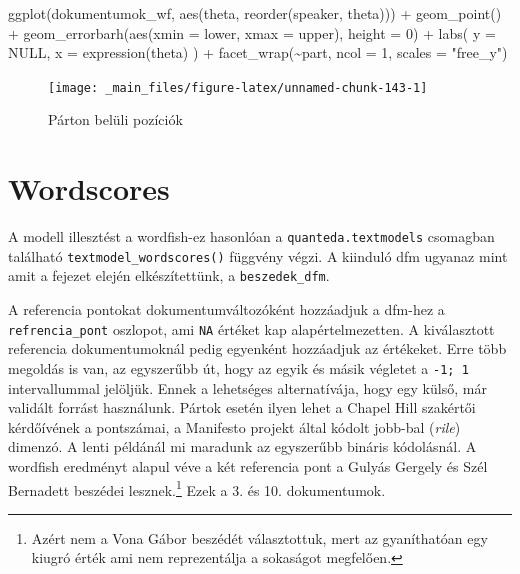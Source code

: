 \documentclass[
]{book}
\newenvironment{Shaded}{\begin{snugshade}}{\end{snugshade}}
\newcommand{\AttributeTok}[1]{\textcolor[rgb]{0.77,0.63,0.00}{#1}}
\newcommand{\ConstantTok}[1]{\textcolor[rgb]{0.00,0.00,0.00}{#1}}
\newcommand{\DecValTok}[1]{\textcolor[rgb]{0.00,0.00,0.81}{#1}}
\newcommand{\FunctionTok}[1]{\textcolor[rgb]{0.00,0.00,0.00}{#1}}
\newcommand{\NormalTok}[1]{#1}
\newcommand{\SpecialCharTok}[1]{\textcolor[rgb]{0.00,0.00,0.00}{#1}}
\newcommand{\StringTok}[1]{\textcolor[rgb]{0.31,0.60,0.02}{#1}}
\begin{document}
\begin{Shaded}
\begin{Highlighting}[]
\FunctionTok{ggplot}\NormalTok{(dokumentumok\_wf, }\FunctionTok{aes}\NormalTok{(theta, }\FunctionTok{reorder}\NormalTok{(speaker, theta))) }\SpecialCharTok{+}
  \FunctionTok{geom\_point}\NormalTok{() }\SpecialCharTok{+}
  \FunctionTok{geom\_errorbarh}\NormalTok{(}\FunctionTok{aes}\NormalTok{(}\AttributeTok{xmin =}\NormalTok{ lower, }\AttributeTok{xmax =}\NormalTok{ upper), }\AttributeTok{height =} \DecValTok{0}\NormalTok{) }\SpecialCharTok{+}
  \FunctionTok{labs}\NormalTok{(}
    \AttributeTok{y =} \ConstantTok{NULL}\NormalTok{,}
    \AttributeTok{x =} \FunctionTok{expression}\NormalTok{(theta)}
\NormalTok{  ) }\SpecialCharTok{+}
  \FunctionTok{facet\_wrap}\NormalTok{(}\SpecialCharTok{\textasciitilde{}}\NormalTok{part, }\AttributeTok{ncol =} \DecValTok{1}\NormalTok{, }\AttributeTok{scales =} \StringTok{"free\_y"}\NormalTok{)}
\end{Highlighting}
\end{Shaded}

\begin{figure}

{\centering \texttt{[image: \_main\_files/figure-latex/unnamed-chunk-143-1]} 

}

\caption{Párton belüli pozíciók}\label{fig:unnamed-chunk-143}
\end{figure}

\hypertarget{wordscores}{%
\section{Wordscores}\label{wordscores}}

A modell illesztést a wordfish-ez hasonlóan a
\texttt{quanteda.textmodels} csomagban található
\texttt{textmodel\_wordscores()} függvény végzi. A kiinduló dfm ugyanaz
mint amit a fejezet elején elkészítettünk, a \texttt{beszedek\_dfm}.

A referencia pontokat dokumentumváltozóként hozzáadjuk a dfm-hez a
\texttt{refrencia\_pont} oszlopot, ami \texttt{NA} értéket kap
alapértelmezetten. A kiválasztott referencia dokumentumoknál pedig
egyenként hozzáadjuk az értékeket. Erre több megoldás is van, az
egyszerűbb út, hogy az egyik és másik végletet a \texttt{-1;\ 1}
intervallummal jelöljük. Ennek a lehetséges alternatívája, hogy egy
külső, már validált forrást használunk. Pártok esetén ilyen lehet a
Chapel Hill szakértői kérdőívének a pontszámai, a Manifesto projekt
által kódolt jobb-bal (\emph{rile}) dimenzó. A lenti példánál mi
maradunk az egyszerűbb bináris kódolásnál. A wordfish eredményt alapul
véve a két referencia pont a Gulyás Gergely és Szél Bernadett beszédei
lesznek.\footnote{Azért nem a Vona Gábor beszédét választottuk, mert az
  gyaníthatóan egy kiugró érték ami nem reprezentálja a sokaságot
  megfelően.} Ezek a 3. és 10. dokumentumok.
\end{document}

